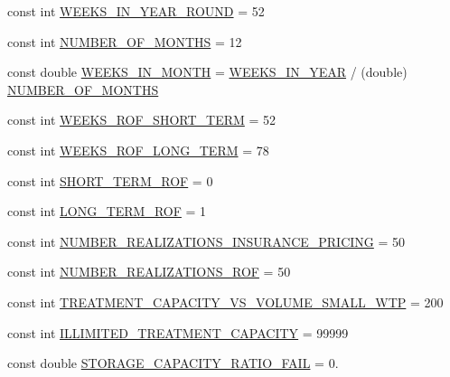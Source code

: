\begin{DoxyCompactItemize}
const int \mbox{\hyperlink{namespaceConstants_aa20160c39be15e5da1535608aaa0647c}{W\+E\+E\+K\+S\+\_\+\+I\+N\+\_\+\+Y\+E\+A\+R\+\_\+\+R\+O\+U\+ND}} = 52
\item 
const int \mbox{\hyperlink{namespaceConstants_aced78823f6427b8251297408fa8e6555}{N\+U\+M\+B\+E\+R\+\_\+\+O\+F\+\_\+\+M\+O\+N\+T\+HS}} = 12
\item 
const double \mbox{\hyperlink{namespaceConstants_a74ad24a642858cc193c678329422e5ad}{W\+E\+E\+K\+S\+\_\+\+I\+N\+\_\+\+M\+O\+N\+TH}} = \mbox{\hyperlink{namespaceConstants_a19e84af3cbc6e1318beb22408c2a1f2f}{W\+E\+E\+K\+S\+\_\+\+I\+N\+\_\+\+Y\+E\+AR}} / (double) \mbox{\hyperlink{namespaceConstants_aced78823f6427b8251297408fa8e6555}{N\+U\+M\+B\+E\+R\+\_\+\+O\+F\+\_\+\+M\+O\+N\+T\+HS}}
\item 
const int \mbox{\hyperlink{namespaceConstants_a0317a1ca51d926d052cf05cdc9084c69}{W\+E\+E\+K\+S\+\_\+\+R\+O\+F\+\_\+\+S\+H\+O\+R\+T\+\_\+\+T\+E\+RM}} = 52
\item 
const int \mbox{\hyperlink{namespaceConstants_a9c3126b36f6a31b4c94e2a75f99a64c2}{W\+E\+E\+K\+S\+\_\+\+R\+O\+F\+\_\+\+L\+O\+N\+G\+\_\+\+T\+E\+RM}} = 78
\item 
const int \mbox{\hyperlink{namespaceConstants_ab10a2c333b2bada353b0eb77cdf98480}{S\+H\+O\+R\+T\+\_\+\+T\+E\+R\+M\+\_\+\+R\+OF}} = 0
\item 
const int \mbox{\hyperlink{namespaceConstants_a24006f6443ebe1696dc264eafd778b02}{L\+O\+N\+G\+\_\+\+T\+E\+R\+M\+\_\+\+R\+OF}} = 1
\item 
const int \mbox{\hyperlink{namespaceConstants_a81043bd68881023e5ad54e3bc1e5366f}{N\+U\+M\+B\+E\+R\+\_\+\+R\+E\+A\+L\+I\+Z\+A\+T\+I\+O\+N\+S\+\_\+\+I\+N\+S\+U\+R\+A\+N\+C\+E\+\_\+\+P\+R\+I\+C\+I\+NG}} = 50
\item 
const int \mbox{\hyperlink{namespaceConstants_ad6b1922ee031afa4b93176968d060fdf}{N\+U\+M\+B\+E\+R\+\_\+\+R\+E\+A\+L\+I\+Z\+A\+T\+I\+O\+N\+S\+\_\+\+R\+OF}} = 50
\item 
const int \mbox{\hyperlink{namespaceConstants_ae054475fbe2eafea2a6417bddf4d07c9}{T\+R\+E\+A\+T\+M\+E\+N\+T\+\_\+\+C\+A\+P\+A\+C\+I\+T\+Y\+\_\+\+V\+S\+\_\+\+V\+O\+L\+U\+M\+E\+\_\+\+S\+M\+A\+L\+L\+\_\+\+W\+TP}} = 200
\item 
const int \mbox{\hyperlink{namespaceConstants_a878f191b27592c59c7d708412dee03af}{I\+L\+L\+I\+M\+I\+T\+E\+D\+\_\+\+T\+R\+E\+A\+T\+M\+E\+N\+T\+\_\+\+C\+A\+P\+A\+C\+I\+TY}} = 99999
\item 
const double \mbox{\hyperlink{namespaceConstants_a70548c8633a7d66b6bae5178050ed0bb}{S\+T\+O\+R\+A\+G\+E\+\_\+\+C\+A\+P\+A\+C\+I\+T\+Y\+\_\+\+R\+A\+T\+I\+O\+\_\+\+F\+A\+IL}} = 0.

\end{DoxyCompactItemize}
